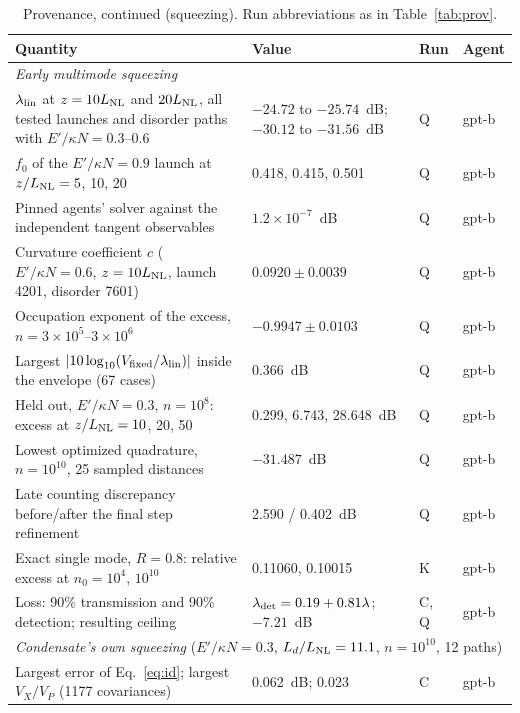 \documentclass[aps,pra,twocolumn,superscriptaddress,nofootinbib,floatfix]{revtex4-2}
\newcommand{\LNL}{L_{\rm NL}}
\newcommand{\ekn}{E'/\kappa N}
\begin{document}
\begin{table}[t]
\caption{Provenance, continued (squeezing). Run abbreviations as in Table~\ref{tab:prov}.}
\label{tab:prov2}
\begin{ruledtabular}
\begin{tabular}{p{9.4cm}p{4.8cm}p{0.9cm}p{1.9cm}}
\raggedright Quantity & \raggedright Value & \raggedright Run & \raggedright Agent \tabularnewline \hline
\multicolumn{4}{l}{\textit{Early multimode squeezing}} \tabularnewline
\raggedright $\lambda_{\rm lin}$ at $z=10\LNL$ and $20\LNL$, all tested launches and disorder paths with $\ekn=0.3$--0.6 & \raggedright $-24.72$ to $-25.74$~dB; $-30.12$ to $-31.56$~dB & \raggedright Q & \raggedright gpt-b \tabularnewline
\raggedright $f_0$ of the $\ekn=0.9$ launch at $z/\LNL=5$, 10, 20 & \raggedright 0.418, 0.415, 0.501 & \raggedright Q & \raggedright gpt-b \tabularnewline
\raggedright Pinned agents' solver against the independent tangent observables & \raggedright $1.2\times10^{-7}$~dB & \raggedright Q & \raggedright gpt-b \tabularnewline
\raggedright Curvature coefficient $c$ ($\ekn=0.6$, $z=10\LNL$, launch 4201, disorder 7601) & \raggedright $0.0920\pm0.0039$ & \raggedright Q & \raggedright gpt-b \tabularnewline
\raggedright Occupation exponent of the excess, $n=3\times10^5$--$3\times10^6$ & \raggedright $-0.9947\pm0.0103$ & \raggedright Q & \raggedright gpt-b \tabularnewline
\raggedright Largest $|10\log_{10}(V_{\rm fixed}/\lambda_{\rm lin})|$ inside the envelope (67 cases) & \raggedright 0.366~dB & \raggedright Q & \raggedright gpt-b \tabularnewline
\raggedright Held out, $\ekn=0.3$, $n=10^8$: excess at $z/\LNL=10$, 20, 50 & \raggedright 0.299, 6.743, 28.648~dB & \raggedright Q & \raggedright gpt-b \tabularnewline
\raggedright Lowest optimized quadrature, $n=10^{10}$, 25 sampled distances & \raggedright $-31.487$~dB & \raggedright Q & \raggedright gpt-b \tabularnewline
\raggedright Late counting discrepancy before/after the final step refinement & \raggedright 2.590 / 0.402~dB & \raggedright Q & \raggedright gpt-b \tabularnewline
\raggedright Exact single mode, $R=0.8$: relative excess at $n_0=10^4$, $10^{10}$ & \raggedright 0.11060, 0.10015 & \raggedright K & \raggedright gpt-b \tabularnewline
\raggedright Loss: 90\% transmission and 90\% detection; resulting ceiling & \raggedright $\lambda_{\rm det}=0.19+0.81\lambda$; $-7.21$~dB & \raggedright C, Q & \raggedright gpt-b \tabularnewline
\multicolumn{4}{l}{\textit{Condensate's own squeezing} ($\ekn=0.3$, $L_d/\LNL=11.1$, $n=10^{10}$, 12 paths)} \tabularnewline
\raggedright Largest error of Eq.~\eqref{eq:id}; largest $V_X/V_P$ (1177 covariances) & \raggedright 0.062~dB; 0.023 & \raggedright C & \raggedright gpt-b \tabularnewline

\end{tabular}
\end{ruledtabular}
\end{table}
\end{document}
